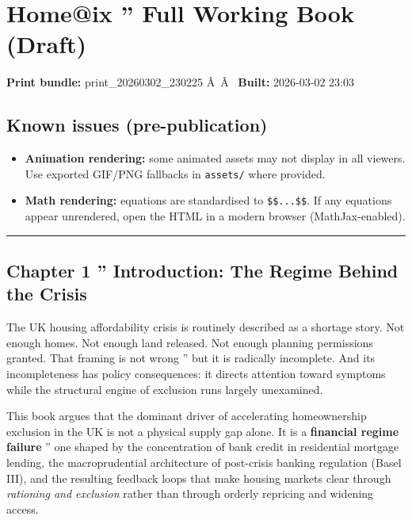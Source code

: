 \documentclass[
]{article}
\author{}
\date{}
\providecommand{\tightlist}{%
  \setlength{\itemsep}{0pt}\setlength{\parskip}{0pt}}
\begin{document}
\section{Home@ix '' Full Working Book
(Draft)}\label{homeix-full-working-book-draft}

\textbf{Print bundle:} print\_20260302\_230225 Â~\textbar Â~
\textbf{Built:} 2026-03-02 23:03

\subsection{Known issues
(pre-publication)}\label{known-issues-pre-publication}

\begin{itemize}
\tightlist
\item
  \textbf{Animation rendering:} some animated assets may not display in
  all viewers. Use exported GIF/PNG fallbacks in \texttt{assets/} where
  provided.
\item
  \textbf{Math rendering:} equations are standardised to
  \texttt{\$\$...\$\$}. If any equations appear unrendered, open the
  HTML in a modern browser (MathJax-enabled).
\end{itemize}

\begin{center}\rule{0.5\linewidth}{0.5pt}\end{center}

\protect{}\label{my-new-section-title}
\protect{}\label{chapter-1}
\subsection{Chapter 1 '' Introduction: The Regime Behind the
Crisis}\label{chapter-1-introduction-the-regime-behind-the-crisis}

The UK housing affordability crisis is routinely described as a shortage
story. Not enough homes. Not enough land released. Not enough planning
permissions granted. That framing is not wrong '' but it is radically
incomplete. And its incompleteness has policy consequences: it directs
attention toward symptoms while the structural engine of exclusion runs
largely unexamined.

This book argues that the dominant driver of accelerating homeownership
exclusion in the UK is not a physical supply gap alone. It is a
\textbf{financial regime failure} '' one shaped by the concentration of
bank credit in residential mortgage lending, the macroprudential
architecture of post-crisis banking regulation (Basel III), and the
resulting feedback loops that make housing markets clear through
\emph{rationing and exclusion} rather than through orderly repricing and
widening access.
\end{document}
